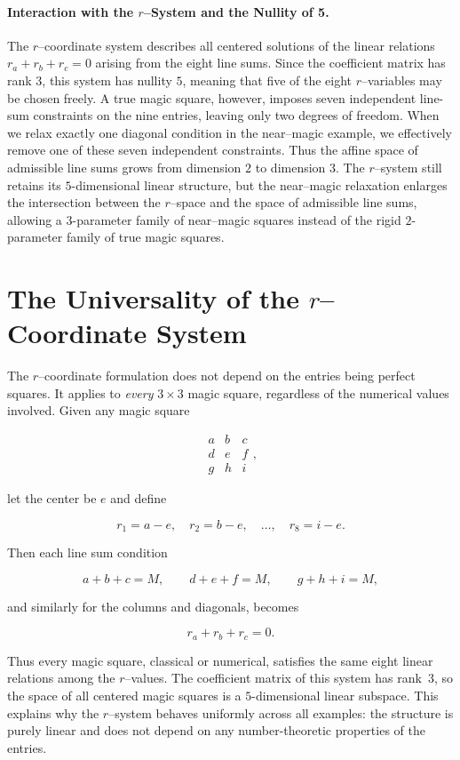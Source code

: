 \documentclass[12pt]{article}
\begin{document}
\paragraph{Interaction with the $r$--System and the Nullity of 5.}
The $r$--coordinate system describes all centered solutions of the linear
relations $r_a+r_b+r_c=0$ arising from the eight line sums.  Since the
coefficient matrix has rank $3$, this system has nullity $5$, meaning that
five of the eight $r$--variables may be chosen freely.  A true magic square,
however, imposes seven independent line-sum constraints on the nine entries,
leaving only two degrees of freedom.  When we relax exactly one diagonal
condition in the near--magic example, we effectively remove one of these seven
independent constraints.  Thus the affine space of admissible line sums grows
from dimension $2$ to dimension $3$.  The $r$--system still retains its
$5$-dimensional linear structure, but the near--magic relaxation enlarges the
intersection between the $r$--space and the space of admissible line sums,
allowing a $3$-parameter family of near--magic squares instead of the rigid
$2$-parameter family of true magic squares.

\section*{The Universality of the $r$--Coordinate System}

The $r$--coordinate formulation does not depend on the entries being perfect
squares.  It applies to \emph{every} $3\times 3$ magic square, regardless of
the numerical values involved.  Given any magic square


\[
\begin{matrix}
a & b & c \\
d & e & f \\
g & h & i
\end{matrix},
\]


let the center be $e$ and define


\[
r_1 = a-e,\quad r_2 = b-e,\quad \dots,\quad r_8 = i-e.
\]


Then each line sum condition


\[
a+b+c = M,\qquad d+e+f = M,\qquad g+h+i = M,
\]


and similarly for the columns and diagonals, becomes


\[
r_a + r_b + r_c = 0.
\]



Thus every magic square, classical or numerical, satisfies the same eight
linear relations among the $r$--values.  The coefficient matrix of this system
has rank~$3$, so the space of all centered magic squares is a $5$-dimensional
linear subspace.  This explains why the $r$--system behaves uniformly across
all examples: the structure is purely linear and does not depend on any
number-theoretic properties of the entries.
\end{document}
